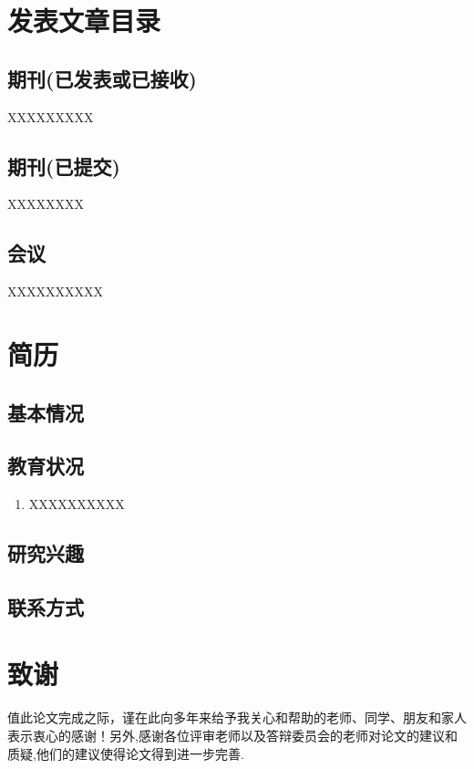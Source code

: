 
\chapter{发表文章目录}
\begin{enumerate}[label={[\theenumi]}]
\section*{期刊(已发表或已接收)}

\item  XXXXXXXXX

\section*{期刊(已提交)}
\item XXXXXXXX

\section*{会议}
\item XXXXXXXXXX

\end{enumerate}


\chapter{简\qquad 历}

\section*{基本情况}


\section*{教育状况}
\begin{enumerate}
\item XXXXXXXXXX
\end{enumerate}

\section*{研究兴趣}

\section*{联系方式}



\chapter{致\qquad 谢}

值此论文完成之际，谨在此向多年来给予我关心和帮助的老师、同学、朋友和家人表示衷心的感谢！另外,感谢各位评审老师以及答辩委员会的老师对论文的建议和质疑,他们的建议使得论文得到进一步完善.
